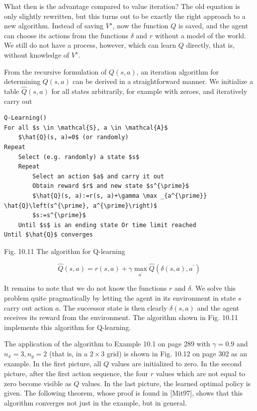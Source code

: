 \documentclass[10pt]{book}
\begin{document}
\begin{center}
\begin{enumerate}
\begin{center}
\begin{center}
\begin{center}
\begin{center}
What then is the advantage compared to value iteration? The old equation is only slightly rewritten, but this turns out to be exactly the right approach to a new algorithm. Instead of saving $V^{\star}$, now the function $Q$ is saved, and the agent can choose its actions from the functions $\delta$ and $r$ without a model of the world. We still do not have a process, however, which can learn $Q$ directly, that is, without knowledge of $V^{\star}$.

From the recursive formulation of $Q(s, a)$, an iteration algorithm for determining $Q(s, a)$ can be derived in a straightforward manner. We initialize a table $\hat{Q}(s, a)$ for all states arbitrarily, for example with zeroes, and iteratively carry out

\begin{verbatim}
Q-Learning()
For all $s \in \mathcal{S}, a \in \mathcal{A}$
    $\hat{Q}(s, a)=0$ (or randomly)
Repeat
    Select (e.g. randomly) a state $s$
    Repeat
        Select an action $a$ and carry it out
        Obtain reward $r$ and new state $s^{\prime}$
        $\hat{Q}(s, a):=r(s, a)+\gamma \max _{a^{\prime}} \hat{Q}\left(s^{\prime}, a^{\prime}\right)$
        $s:=s^{\prime}$
    Until $s$ is an ending state Or time limit reached
Until $\hat{Q}$ converges
\end{verbatim}

Fig. 10.11 The algorithm for Q-learning



\begin{equation*}
\hat{Q}(s, a)=r(s, a)+\gamma \max _{a^{\prime}} \hat{Q}\left(\delta(s, a), a^{\prime}\right) \tag{10.12}
\end{equation*}


It remains to note that we do not know the functions $r$ and $\delta$. We solve this problem quite pragmatically by letting the agent in its environment in state $s$ carry out action $a$. The successor state is then clearly $\delta(s, a)$ and the agent receives its reward from the environment. The algorithm shown in Fig. 10.11 implements this algorithm for Q-learning.

The application of the algorithm to Example 10.1 on page 289 with $\gamma=0.9$ and $n_{x}=3, n_{y}=2$ (that is, in a $2 \times 3$ grid) is shown in Fig. 10.12 on page 302 as an example. In the first picture, all $Q$ values are initialized to zero. In the second picture, after the first action sequence, the four $r$ values which are not equal to zero become visible as $Q$ values. In the last picture, the learned optimal policy is given. The following theorem, whose proof is found in [Mit97], shows that this algorithm converges not just in the example, but in general.


\end{center}
\end{center}
\end{center}
\end{center}
\end{enumerate}
\end{center}
\end{document}
